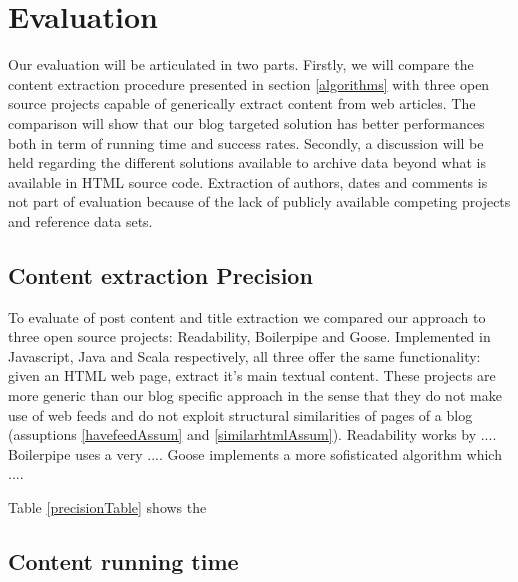 \section{Evaluation}

Our evaluation will be articulated in two parts. Firstly, we will compare the content extraction procedure presented in section \ref{algorithms} with three open source projects capable of generically extract content from web articles. The comparison will show that our blog targeted solution has better performances both in term of running time and success rates. Secondly, a discussion will be held regarding the different solutions available to archive data beyond what is available in HTML source code. Extraction of authors, dates and comments is not part of evaluation because of the lack of publicly available competing projects and reference data sets.


\subsection{Content extraction Precision}
To evaluate of post content and title extraction we compared our approach to three open source projects: Readability\cite{}, Boilerpipe\cite{kohlschuetter2010} and Goose\cite{}. Implemented in Javascript, Java and Scala respectively, all three offer the same functionality: given an HTML web page, extract it's main textual content. These projects are more generic than our blog specific approach in the sense that they do not make use of web feeds and do not exploit structural similarities of pages of a blog (assuptions \ref{havefeedAssum} and \ref{similarhtmlAssum}). Readability works by .... Boilerpipe uses a very .... Goose implements a more sofisticated algorithm which ....

\cite{burton2011}

Table \ref{precisionTable} shows the
\precisionTable


\subsection{Content running time}




